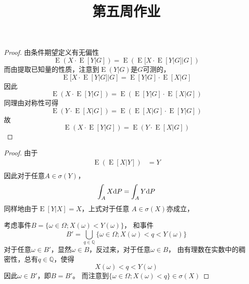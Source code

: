 \documentclass[cn]{homework}
\title{第五周作业}
\DeclareMathOperator{\E}{E}
\begin{document}
    \maketitle

    \problem
    \begin{proof}
        由条件期望定义有无偏性
        \[\E(X\cdot \E[Y|G])=\E(\E[X\cdot \E[Y|G]|G])\]
        而由提取已知量的性质，注意到$\E(Y|G)$是$G$可测的，
        \[\E[X\cdot \E[Y|G]|G]=\E[Y|G]\cdot \E[X|G]\]
        因此
        \[\E(X\cdot \E[Y|G])=\E(\E[Y|G]\cdot \E[X|G])\]
        同理由对称性可得
        \[\E(Y\cdot \E[X|G])=\E(\E[X|G]\cdot \E[Y|G])\]
        故
        \[\E(X\cdot \E[Y|G])=\E(Y\cdot \E[X|G])\]
    \end{proof}

    \problem
    \begin{subproblem}
        \item

        \item
        \begin{proof}
            由于
            \[\begin{aligned}
                \E(\E[X|Y])&=Y\\
            \end{aligned}\]
            因此对于任意$A\in\sigma(Y)$，
            \[\int_AX\mathrm d P=\int_AY\mathrm d P\]
            同样地由于$\E[Y|X]=X$，上式对于任意
            $A\in\sigma(X)$亦成立，

            考虑事件$B=\{\omega\in\Omega;X(\omega)<Y(\omega)\}$，
            和事件
            \[B'=\bigcup_{q\in\mathbb Q}\{\omega\in\Omega;X(\omega)<q<Y(\omega)\}\]
            对于任意$\omega\in B'$，显然$\omega\in B$，反过来，对于任意$\omega\in B$，
            由有理数在实数中的稠密性，总有$q\in\mathbb Q$，使得
            \[X(\omega)<q<Y(\omega)\]
            因此$\omega\in B'$，即$B=B'$。
            而注意到$\{\omega\in\Omega;X(\omega)<q\}\in\sigma(X)$
            
        \end{proof}
    \end{subproblem}
\end{document}
